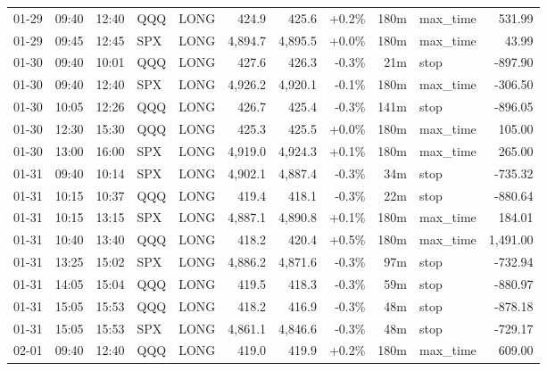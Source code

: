 \documentclass[11pt,a4paper,twoside]{article}
\begin{document}
\begin{center}
\begin{longtable}{>{\color{txtmain}}l l l l l r r r r >{\color{txtmain}}l r}
01-29 & 09:40 & 12:40 & QQQ & LONG & 424.9 & 425.6 & \textcolor{wingreen}{+0.2\%} & 180m & max\_time & \textcolor{wingreen}{531.99} \\
01-29 & 09:45 & 12:45 & SPX & LONG & 4,894.7 & 4,895.5 & \textcolor{wingreen}{+0.0\%} & 180m & max\_time & \textcolor{wingreen}{43.99} \\
01-30 & 09:40 & 10:01 & QQQ & LONG & 427.6 & 426.3 & \textcolor{lossred}{-0.3\%} & 21m & stop & \textcolor{lossred}{-897.90} \\
01-30 & 09:40 & 12:40 & SPX & LONG & 4,926.2 & 4,920.1 & \textcolor{lossred}{-0.1\%} & 180m & max\_time & \textcolor{lossred}{-306.50} \\
01-30 & 10:05 & 12:26 & QQQ & LONG & 426.7 & 425.4 & \textcolor{lossred}{-0.3\%} & 141m & stop & \textcolor{lossred}{-896.05} \\
01-30 & 12:30 & 15:30 & QQQ & LONG & 425.3 & 425.5 & \textcolor{wingreen}{+0.0\%} & 180m & max\_time & \textcolor{wingreen}{105.00} \\
01-30 & 13:00 & 16:00 & SPX & LONG & 4,919.0 & 4,924.3 & \textcolor{wingreen}{+0.1\%} & 180m & max\_time & \textcolor{wingreen}{265.00} \\
01-31 & 09:40 & 10:14 & SPX & LONG & 4,902.1 & 4,887.4 & \textcolor{lossred}{-0.3\%} & 34m & stop & \textcolor{lossred}{-735.32} \\
01-31 & 10:15 & 10:37 & QQQ & LONG & 419.4 & 418.1 & \textcolor{lossred}{-0.3\%} & 22m & stop & \textcolor{lossred}{-880.64} \\
01-31 & 10:15 & 13:15 & SPX & LONG & 4,887.1 & 4,890.8 & \textcolor{wingreen}{+0.1\%} & 180m & max\_time & \textcolor{wingreen}{184.01} \\
01-31 & 10:40 & 13:40 & QQQ & LONG & 418.2 & 420.4 & \textcolor{wingreen}{+0.5\%} & 180m & max\_time & \textcolor{wingreen}{1,491.00} \\
01-31 & 13:25 & 15:02 & SPX & LONG & 4,886.2 & 4,871.6 & \textcolor{lossred}{-0.3\%} & 97m & stop & \textcolor{lossred}{-732.94} \\
01-31 & 14:05 & 15:04 & QQQ & LONG & 419.5 & 418.3 & \textcolor{lossred}{-0.3\%} & 59m & stop & \textcolor{lossred}{-880.97} \\
01-31 & 15:05 & 15:53 & QQQ & LONG & 418.2 & 416.9 & \textcolor{lossred}{-0.3\%} & 48m & stop & \textcolor{lossred}{-878.18} \\
01-31 & 15:05 & 15:53 & SPX & LONG & 4,861.1 & 4,846.6 & \textcolor{lossred}{-0.3\%} & 48m & stop & \textcolor{lossred}{-729.17} \\
02-01 & 09:40 & 12:40 & QQQ & LONG & 419.0 & 419.9 & \textcolor{wingreen}{+0.2\%} & 180m & max\_time & \textcolor{wingreen}{609.00} \\

\end{longtable}
\end{center}
\end{document}
